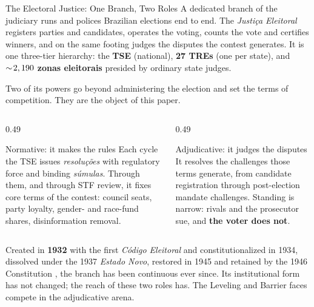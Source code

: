 
\begin{frame}{The Electoral Justice: One Branch, Two Roles}
\hypertarget{src:ejustice}{}
\small
A dedicated branch of the judiciary runs and polices Brazilian elections end to end. The \emph{Justi\c{c}a Eleitoral} registers parties and candidates, operates the voting, counts the vote and certifies winners, and on the same footing judges the disputes the contest generates. It is one three-tier hierarchy: the \textbf{TSE} (national), \textbf{27 TREs} (one per state), and $\sim\!2,190{}$ \textbf{zonas eleitorais} presided by ordinary state judges.\hfill\hyperlink{app:geography}{}
\smallskip

Two of its powers go beyond administering the election and set the terms of competition. They are the object of this paper.
\smallskip
\begin{columns}[T]
\begin{column}{0.49\textwidth}
  \begin{block}{\textcolor{myblue}{Normative}: it makes the rules}
  \scriptsize Each cycle the TSE issues \emph{resolu\c{c}\~oes} with regulatory force and binding \emph{s\'umulas}. Through them, and through STF review, it fixes core terms of the contest: council seats, party loyalty, gender- and race-fund shares, disinformation removal. \hfill\hyperlink{app:timeline}{}
  \end{block}
\end{column}
\begin{column}{0.49\textwidth}
  \begin{block}{\textcolor{myred}{Adjudicative}: it judges the disputes}
  \scriptsize It resolves the challenges those terms generate, from candidate registration through post-election mandate challenges. Standing is narrow: rivals and the prosecutor sue, and \textbf{the voter does not}. \hfill\hyperlink{src:adjudication}{}
  \end{block}
\end{column}
\end{columns}
\smallskip

\footnotesize Created in \textbf{1932} with the first \emph{C\'odigo Eleitoral} and constitutionalized in 1934, dissolved under the 1937 \emph{Estado Novo}, restored in 1945 and retained by the 1946 Constitution , the branch has been continuous ever since. Its institutional form has not changed; the reach of these two roles has. The \textcolor{mygreen}{Leveling} and \textcolor{myred}{Barrier} faces compete in the adjudicative arena.
\end{frame}
